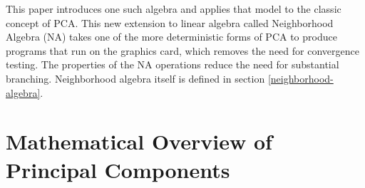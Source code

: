 \documentclass[11pt]{article}
\begin{document}
This paper introduces one such algebra and applies that model to the classic concept of PCA.  %
This new extension to linear algebra called Neighborhood Algebra (NA) takes one of the more deterministic forms of PCA to produce programs that run on the graphics card, which removes the need for convergence testing.  The properties of the NA operations reduce the need for substantial branching.   %
Neighborhood algebra itself is defined in section \ref{neighborhood-algebra}.  






\section{Mathematical Overview of Principal Components}\label{math-overview-section}

\end{document}
